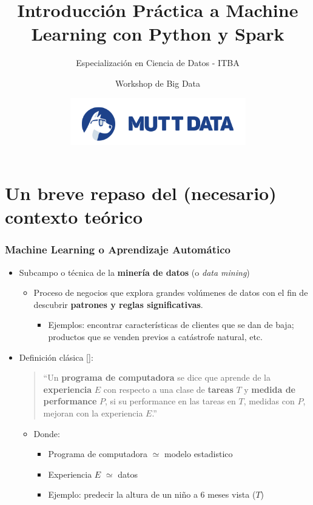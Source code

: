 \documentclass[leqno, 10pt, envcountsect]{beamer}
\title[Intro ML Python]{Introducción Práctica a Machine Learning con Python y
Spark}
\subtitle{Especialización en Ciencia de Datos - ITBA}
\author[]{Workshop de Big Data}
\institute[]{16 de Diciembre de 2020}
\date[]{\includegraphics[scale=0.35]{logo_mutt.png}}
\numberwithin{equation}{section}
\theoremstyle{definition}
\theoremstyle{example}
\numberwithin{figure}{section}
\numberwithin{table}{section}
\let\olditem\item
\renewcommand{\item}{%
\olditem\vspace{1pt}}
\begin{document}
\frame[plain]{\titlepage}

\section{Un breve repaso del (necesario) contexto teórico}
\label{sec:un_poco_de_contexto_teorico}

\begin{frame}[fragile=singleslide]
  \frametitle{Machine Learning o Aprendizaje Automático}
  \begin{itemize}
    \item Subcampo o técnica de la \textbf{minería de datos} (o \textit{data mining})
      \begin{itemize}
        \item Proceso de negocios que explora grandes volúmenes de datos con el
          fin de descubrir \textbf{patrones y reglas significativas}.
        \begin{itemize}
          \item Ejemplos: encontrar características de clientes que se dan de
            baja; productos que se venden previos a catástrofe natural, etc.
        \end{itemize}
      \end{itemize}

    \item Definición clásica [\textcite{mitchell97}]:\\
    \begin{quote}
      \enquote{Un \textbf{programa de computadora} se dice que aprende de la
      \textbf{experiencia} $E$ con respecto a una clase de \textbf{tareas} $T$ y
      \textbf{medida de performance} $P$, si su performance en las tareas en
      $T$, medidas con $P$, mejoran con la experiencia $E$.}
    \end{quote}
    \begin{itemize}
      \item Donde:
        \begin{itemize}
      \item Programa de computadora $\simeq$ modelo estadistico
      \item Experiencia $E$ $\simeq$ datos
      \item Ejemplo: predecir la altura de un niño a 6 meses vista ($T$)
      \end{itemize}
    \end{itemize}
  \end{itemize}
\end{frame}
\end{document}
